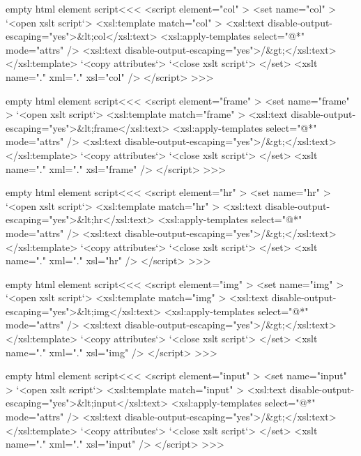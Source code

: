 \documentclass{article}
\begin{document}
{{{ \<empty html element script\><<< 
<script element="col" > 
   <set name="col" > 
      `<open xslt script`> 
      <xsl:template match="col" > 
         <xsl:text disable-output-escaping="yes">&lt;col</xsl:text> 
             <xsl:apply-templates select="@*" mode="attrs" /> 
         <xsl:text disable-output-escaping="yes">/&gt;</xsl:text> 
      </xsl:template>  
      `<copy attributes`> 
      `<close xslt script`> 
   </set> 
   <xslt name="." xml="." xsl="col" /> 
</script>  
>>> 




 \<empty html element script\><<< 
<script element="frame" > 
   <set name="frame" > 
      `<open xslt script`> 
      <xsl:template match="frame" > 
         <xsl:text disable-output-escaping="yes">&lt;frame</xsl:text> 
             <xsl:apply-templates select="@*" mode="attrs" /> 
         <xsl:text disable-output-escaping="yes">/&gt;</xsl:text> 
      </xsl:template>  
      `<copy attributes`> 
      `<close xslt script`> 
   </set> 
   <xslt name="." xml="." xsl="frame" /> 
</script>  
>>> 




 \<empty html element script\><<< 
<script element="hr" > 
   <set name="hr" > 
      `<open xslt script`> 
      <xsl:template match="hr" > 
         <xsl:text disable-output-escaping="yes">&lt;hr</xsl:text> 
             <xsl:apply-templates select="@*" mode="attrs" /> 
         <xsl:text disable-output-escaping="yes">/&gt;</xsl:text> 
      </xsl:template>  
      `<copy attributes`> 
      `<close xslt script`> 
   </set> 
   <xslt name="." xml="." xsl="hr" /> 
</script>  
>>> 




 \<empty html element script\><<< 
<script element="img" > 
   <set name="img" > 
      `<open xslt script`> 
      <xsl:template match="img" > 
         <xsl:text disable-output-escaping="yes">&lt;img</xsl:text> 
             <xsl:apply-templates select="@*" mode="attrs" /> 
         <xsl:text disable-output-escaping="yes">/&gt;</xsl:text> 
      </xsl:template>  
      `<copy attributes`> 
      `<close xslt script`> 
   </set> 
   <xslt name="." xml="." xsl="img" /> 
</script>  
>>> 




 \<empty html element script\><<< 
<script element="input" > 
   <set name="input" > 
      `<open xslt script`> 
      <xsl:template match="input" > 
         <xsl:text disable-output-escaping="yes">&lt;input</xsl:text> 
             <xsl:apply-templates select="@*" mode="attrs" /> 
         <xsl:text disable-output-escaping="yes">/&gt;</xsl:text> 
      </xsl:template>  
      `<copy attributes`> 
      `<close xslt script`> 
   </set> 
   <xslt name="." xml="." xsl="input" /> 
</script>  
>>> 




}}}
\end{document}

